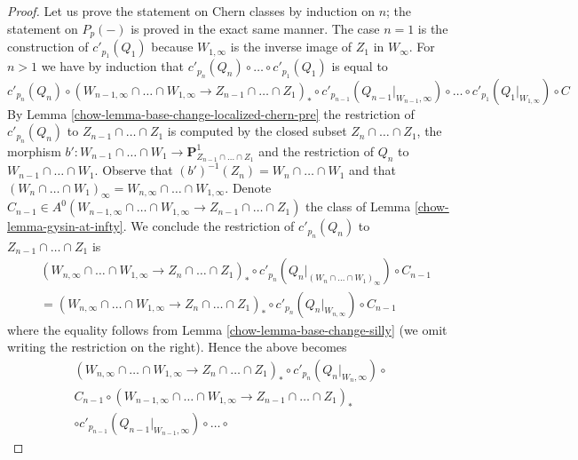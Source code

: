 \begin{proof}

Let us prove the statement on Chern classes by induction on $n$;
the statement on $P_p(-)$ is proved in the exact same manner.
The case $n = 1$ is the construction of $c'_{p_1}(Q_1)$ because
$W_{1, \infty}$ is the inverse image of $Z_1$ in $W_\infty$.
For $n > 1$ we have by induction that
$c'_{p_n}(Q_n) \circ \ldots \circ c'_{p_1}(Q_1)$ is equal to
$$
c'_{p_n}(Q_n) \circ
(W_{n - 1, \infty} \cap \ldots \cap W_{1, \infty} \to
Z_{n - 1} \cap \ldots \cap Z_1)_* \circ
c'_{p_{n - 1}}(Q_{n - 1}|_{W_{n - 1}, \infty}) \circ \ldots \circ
c'_{p_1}(Q_1|_{W_{1, \infty}})
\circ C
$$
By Lemma \ref{chow-lemma-base-change-localized-chern-pre} the restriction of
$c'_{p_n}(Q_n)$ to $Z_{n - 1} \cap \ldots \cap Z_1$ is computed by
the closed subset $Z_n \cap \ldots \cap Z_1$, the morphism
$b' : W_{n - 1} \cap \ldots \cap W_1 \to
\mathbf{P}^1_{Z_{n - 1} \cap \ldots \cap Z_1}$
and the restriction of $Q_n$ to $W_{n - 1} \cap \ldots \cap W_1$.
Observe that $(b')^{-1}(Z_n) = W_n \cap \ldots \cap W_1$
and that $(W_n \cap \ldots \cap W_1)_\infty =
W_{n, \infty} \cap \ldots \cap W_{1, \infty}$.
Denote $C_{n - 1} \in A^0(W_{n - 1, \infty} \cap \ldots \cap W_{1, \infty} \to
Z_{n - 1} \cap \ldots \cap Z_1)$ the class of Lemma \ref{chow-lemma-gysin-at-infty}.
We conclude the restriction of $c'_{p_n}(Q_n)$ to
$Z_{n - 1} \cap \ldots \cap Z_1$ is
\begin{align*}
&
(W_{n, \infty} \cap \ldots \cap W_{1, \infty} \to Z_n \cap \ldots \cap Z_1)_*
\circ
c'_{p_n}(Q_n|_{(W_n \cap \ldots \cap W_1)_\infty})
\circ
C_{n - 1} \\
& =
(W_{n, \infty} \cap \ldots \cap W_{1, \infty} \to Z_n \cap \ldots \cap Z_1)_*
\circ
c'_{p_n}(Q_n|_{W_{n, \infty}})
\circ
C_{n - 1}
\end{align*}
where the equality follows from Lemma \ref{chow-lemma-base-change-silly}
(we omit writing the restriction on the right). Hence the above becomes
\begin{align*}
(W_{n, \infty} \cap \ldots \cap W_{1, \infty} \to
Z_n \cap \ldots \cap Z_1)_* \circ
c'_{p_n}(Q_n|_{W_n, \infty}) \circ \\
C_{n - 1} \circ
(W_{n - 1, \infty} \cap \ldots \cap W_{1, \infty} \to
Z_{n - 1} \cap \ldots \cap Z_1)_* \\
\circ
c'_{p_{n - 1}}(Q_{n - 1}|_{W_{n - 1}, \infty}) \circ \ldots \circ

\end{align*}
\end{proof}
